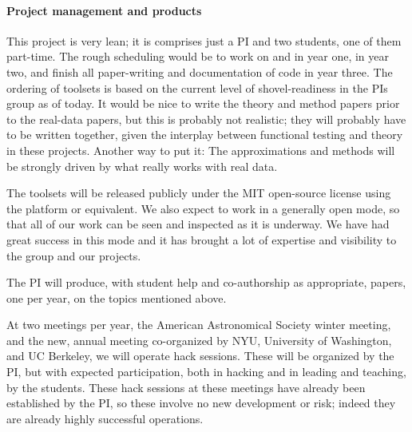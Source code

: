 \documentclass[12pt]{article}
\begin{document}
\paragraph{Project management and products}

This project is very lean; it is comprises just a PI and two
students, one of them part-time.
The rough scheduling would be to work on  and
 in year one,  in year two, and
finish all paper-writing and documentation of code in year three.
The ordering of toolsets is based on the current level of shovel-readiness
in the PIs group as of today.
It would be nice to write the theory and method papers prior to the
real-data papers, but this is probably not realistic; they will
probably have to be written together, given the interplay between
functional testing and theory in these projects.
Another way to put it: The approximations and methods will be strongly
driven by what really works with real data.

The toolsets will be released publicly under the MIT open-source
license using the platform  or equivalent.
We also expect to work in a generally open mode, so that all of our
work can be seen and inspected as it is underway.
We have had great success in this mode and it has brought a lot of
expertise and visibility to the group and our projects.

The PI will produce, with student help and co-authorship as
appropriate,  papers, one per year, on
the topics mentioned above.

At two meetings per year, the American Astronomical Society winter
meeting, and the new, annual  meeting
co-organized by NYU, University of Washington, and UC Berkeley, we
will operate hack sessions.  These will be organized by the PI, but
with expected participation, both in hacking and in leading and
teaching, by the students.
These hack sessions at these meetings have already been established by
the PI, so these involve no new development or risk; indeed they are
already highly successful operations.
\end{document}
